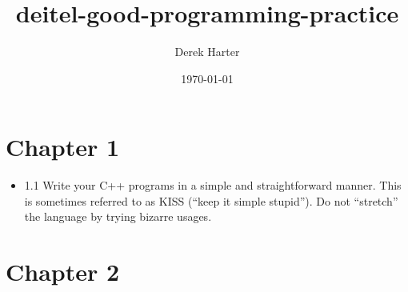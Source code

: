 \documentclass[11pt]{article}
\author{Derek Harter}
\date{\today}
\title{deitel-good-programming-practice}
\begin{document}
\maketitle
\tableofcontents

\section{Chapter 1}
\label{sec-1}

\begin{itemize}
\item 1.1 Write your C++ programs in a simple and straightforward
manner. This is sometimes referred to as KISS (“keep it simple
stupid”). Do not “stretch” the language by trying bizarre usages.
\end{itemize}
\section{Chapter 2}
\label{sec-2}
\end{document}
